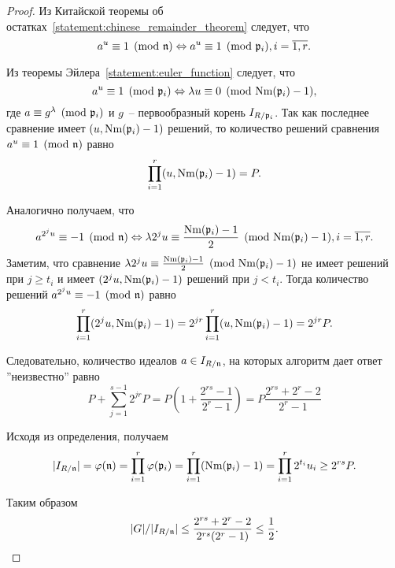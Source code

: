 \documentclass[_00_dissertation.tex]{subfiles}
\begin{document}
\begin{proof}
    Из Китайской теоремы об остатках~\ref{statement:chinese_remainder_theorem} следует, что
    \begin{equation*}
        a^u \equiv 1 \pmod{\mathfrak{n}}
        \Leftrightarrow
        a^u \equiv 1 \pmod{\mathfrak{p}_i}, i=\overline{1, r}.
    \end{equation*}

    Из теоремы Эйлера~\ref{statement:euler_function} следует, что
    \begin{equation*}
        a^u \equiv 1 \pmod{\mathfrak{p}_i}
        \Leftrightarrow
        \lambda u \equiv 0 \pmod{\textrm{Nm}(\mathfrak{p}_i) - 1},
    \end{equation*}
    где $a \equiv g^\lambda \pmod{\mathfrak{p}_i}$ и $g$~-- первообразный корень $I_{R/\mathfrak{p}_i}$.
    Так как последнее сравнение имеет $(u, \textrm{Nm}(\mathfrak{p}_i) - 1)$ решений, то количество решений сравнения $a^u \equiv 1 \pmod{\mathfrak{n}}$ равно
    \begin{equation*}
        \prod_{i=1}^r (u, \textrm{Nm}(\mathfrak{p}_i) - 1) = P.
    \end{equation*}

    Аналогично получаем, что
    \begin{equation*}
        a^{2^j u} \equiv -1 \pmod{\mathfrak{n}}
        \Leftrightarrow
        \lambda 2^j u \equiv \frac{\textrm{Nm}(\mathfrak{p}_i) - 1}{2} \pmod{\textrm{Nm}(\mathfrak{p}_i) - 1}, i=\overline{1, r}.
    \end{equation*}
    Заметим, что сравнение $\lambda 2^j u \equiv \frac{\textrm{Nm}(\mathfrak{p}_i) - 1}{2} \pmod{\textrm{Nm}(\mathfrak{p}_i) - 1}$ не имеет решений при $j \ge t_i$ и имеет $(2^j u, \textrm{Nm}(\mathfrak{p}_i) - 1)$ решений при $j < t_i$.
    Тогда количество решений $a^{2^j u} \equiv -1 \pmod{\mathfrak{n}}$ равно
    \begin{equation*}
        \prod_{i=1}^r (2^j u, \textrm{Nm}(\mathfrak{p}_i) - 1) = 2^{jr} \prod_{i=1}^r (u, \textrm{Nm}(\mathfrak{p}_i) - 1) = 2^{jr} P.
    \end{equation*}

    Следовательно, количество идеалов $a \in I_{R/\mathfrak{n}}$, на которых алгоритм дает ответ ''неизвестно'' равно
    \begin{equation*}
        P + \sum_{j=1}^{s-1} 2^{jr} P = P\left(1 + \frac{2^{rs} - 1}{2^r - 1}\right) = P\frac{2^{rs} + 2^r - 2}{2^r - 1}
    \end{equation*}

    Исходя из определения, получаем
    \begin{equation*}
        |I_{R/\mathfrak{n}}| = \varphi(\mathfrak{n}) = \prod_{i=1}^r \varphi(\mathfrak{p}_i) = \prod_{i=1}^r (\textrm{Nm}(\mathfrak{p}_i) - 1) = \prod_{i=1}^r 2^{t_i} u_i \ge 2^{rs} P.
    \end{equation*}

    Таким образом
    \begin{equation*}
        |G|/|I_{R/\mathfrak{n}}| \le \frac{2^{rs} + 2^r - 2}{2^{rs}(2^r - 1)} \le \frac{1}{2}.
    \end{equation*}
\end{proof}
\end{document}
